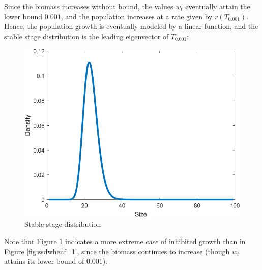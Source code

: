 Since the biomass increases without bound, the values $w_t$ eventually attain the lower bound $0.001$, and the population increases at a rate given by $r(T_{0.001})$. Hence, the population growth is eventually modeled by a linear function, and the stable stage distribution is the leading eigenvector of $T_{0.001}$:

\begin{figure}[H]
	\centering
	\includegraphics[width=0.6\linewidth]{Images/F=1000/ssd_when_f=1000}
	\caption{Stable stage distribution}
	\label{fig:ssdwhenf=1000}
\end{figure}

Note that Figure \ref{fig:ssdwhenf=1000} indicates a more extreme case of inhibited growth than in Figure \ref{fig:ssdwhenf=1}, since the biomass continues to increase (though $w_t$ attains its lower bound of 0.001).













